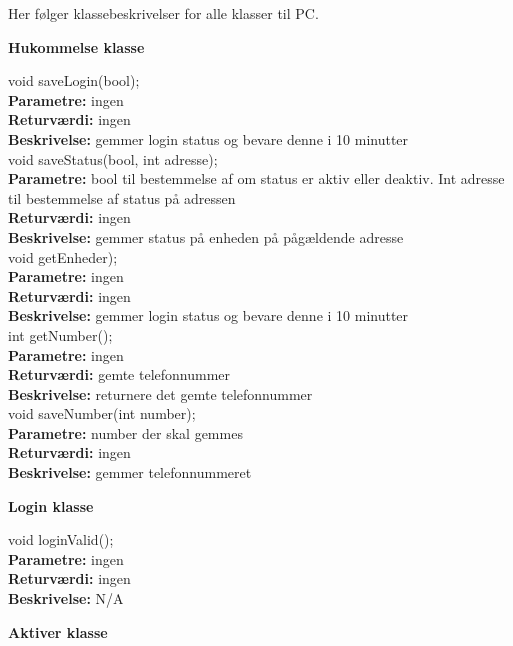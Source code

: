 Her følger klassebeskrivelser for alle klasser til PC. \\

{\centering
\textbf{Hukommelse klasse}\par
}

void saveLogin(bool); \\
\textbf{Parametre:} ingen \\
\textbf{Returværdi:} ingen \\
\textbf{Beskrivelse:} gemmer login status og bevare denne i 10 minutter \\

void saveStatus(bool, int adresse); \\
\textbf{Parametre:} bool til bestemmelse af om status er aktiv eller deaktiv. Int adresse til bestemmelse af status på adressen \\
\textbf{Returværdi:} ingen \\
\textbf{Beskrivelse:} gemmer status på enheden på pågældende adresse \\

void getEnheder); \\
\textbf{Parametre:} ingen \\
\textbf{Returværdi:} ingen \\
\textbf{Beskrivelse:} gemmer login status og bevare denne i 10 minutter \\

int getNumber(); \\
\textbf{Parametre:} ingen \\
\textbf{Returværdi:} gemte telefonnummer \\
\textbf{Beskrivelse:} returnere det gemte telefonnummer \\

void saveNumber(int number); \\
\textbf{Parametre:} number der skal gemmes \\
\textbf{Returværdi:} ingen \\
\textbf{Beskrivelse:} gemmer telefonnummeret \\

{\centering 
\textbf{Login klasse}\par
}

void loginValid(); \\
\textbf{Parametre:} ingen  \\
\textbf{Returværdi:} ingen \\
\textbf{Beskrivelse:} N/A \\

{\centering 
\textbf{Aktiver klasse}\par
}

